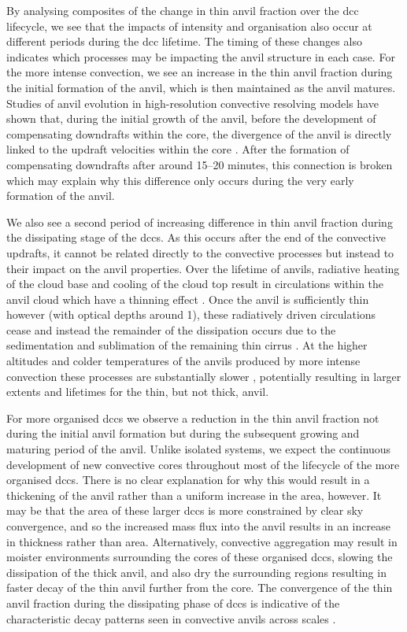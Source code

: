 By analysing composites of the change in thin anvil fraction over the \acrshort{dcc} lifecycle, we see that the impacts of intensity and organisation also occur at different periods during the \acrshort{dcc} lifetime.
The timing of these changes also indicates which processes may be impacting the anvil structure in each case.
For the more intense convection, we see an increase in the thin anvil fraction during the initial formation of the anvil, which is then maintained as the anvil matures.
Studies of anvil evolution in high-resolution convective resolving models have shown that, during the initial growth of the anvil, before the development of compensating downdrafts within the core, the divergence of the anvil is directly linked to the updraft velocities within the core \citep{senf_highresolution_2018}.
After the formation of compensating downdrafts after around 15--20 minutes, this connection is broken which may explain why this difference only occurs during the very early formation of the anvil.

We also see a second period of increasing difference in thin anvil fraction during the dissipating stage of the \acrshort{dcc}s.
As this occurs after the end of the convective updrafts, it cannot be related directly to the convective processes but instead to their impact on the anvil properties.
Over the lifetime of anvils, radiative heating of the cloud base and cooling of the cloud top result in circulations within the anvil cloud which have a thinning effect \citep{gasparini_what_2019}.
Once the anvil is sufficiently thin however (with optical depths around 1), these radiatively driven circulations cease and instead the remainder of the dissipation occurs due to the sedimentation and sublimation of the remaining thin cirrus \citep{sokol_tropical_2020}.
At the higher altitudes and colder temperatures of the anvils produced by more intense convection these processes are substantially slower \citep{seeley_formation_2019}, potentially resulting in larger extents and lifetimes for the thin, but not thick, anvil.

For more organised \acrshort{dcc}s we observe a reduction in the thin anvil fraction not during the initial anvil formation but during the subsequent growing and maturing period of the anvil.
Unlike isolated systems, we expect the continuous development of new convective cores throughout most of the lifecycle of the more organised \acrshort{dcc}s.
There is no clear explanation for why this would result in a thickening of the anvil rather than a uniform increase in the area, however.
It may be that the area of these larger \acrshort{dcc}s is more constrained by clear sky convergence, and so the increased mass flux into the anvil results in an increase in thickness rather than area.
Alternatively, convective aggregation may result in moister environments surrounding the cores of these organised \acrshort{dcc}s, slowing the dissipation of the thick anvil, and also dry the surrounding regions resulting in faster decay of the thin anvil further from the core.
The convergence of the thin anvil fraction during the dissipating phase of \acrshort{dcc}s is indicative of the characteristic decay patterns seen in convective anvils across scales \citep{roca_simple_2017, elsaesser_simple_2022}.

